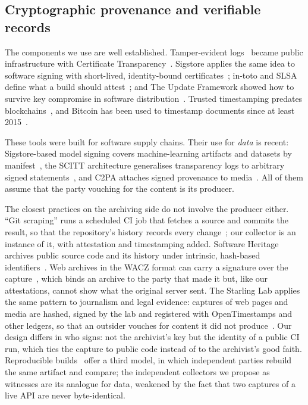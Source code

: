 \subsection{Cryptographic provenance and verifiable records}

The components we use are well established. Tamper-evident logs~\citep{crosby2009tamper} became public infrastructure with Certificate Transparency~\citep{rfc6962,laurie2014ct}. Sigstore applies the same idea to software signing with short-lived, identity-bound certificates~\citep{newman2022sigstore}; in-toto and SLSA define what a build should attest~\citep{torresarias2019intoto,slsa12}; and The Update Framework showed how to survive key compromise in software distribution~\citep{samuel2010tuf}. Trusted timestamping predates blockchains~\citep{haber1991timestamp,rfc3161}, and Bitcoin has been used to timestamp documents since at least 2015~\citep{gipp2015timestamping}.

These tools were built for software supply chains. Their use for \emph{data} is recent: Sigstore-based model signing covers machine-learning artifacts and datasets by manifest~\citep{openssf-oms}, the SCITT architecture generalises transparency logs to arbitrary signed statements~\citep{rfc9943}, and C2PA attaches signed provenance to media~\citep{c2pa25}. All of them assume that the party vouching for the content is its producer.

The closest practices on the archiving side do not involve the producer either. ``Git scraping'' runs a scheduled CI job that fetches a source and commits the result, so that the repository's history records every change~\citep{willison2020git}; our collector is an instance of it, with attestation and timestamping added. Software Heritage archives public source code and its history under intrinsic, hash-based identifiers~\citep{dicosmo2017software}. Web archives in the WACZ format can carry a signature over the capture~\citep{wacz-signing}, which binds an archive to the party that made it but, like our attestations, cannot show what the original server sent. The Starling Lab applies the same pattern to journalism and legal evidence: captures of web pages and media are hashed, signed by the lab and registered with OpenTimestamps and other ledgers, so that an outsider vouches for content it did not produce~\citep{starling-framework}. Our design differs in who signs: not the archivist's key but the identity of a public CI run, which ties the capture to public code instead of to the archivist's good faith. Reproducible builds~\citep{lamb2022reproducible} offer a third model, in which independent parties rebuild the same artifact and compare; the independent collectors we propose as witnesses are its analogue for data, weakened by the fact that two captures of a live API are never byte-identical.

